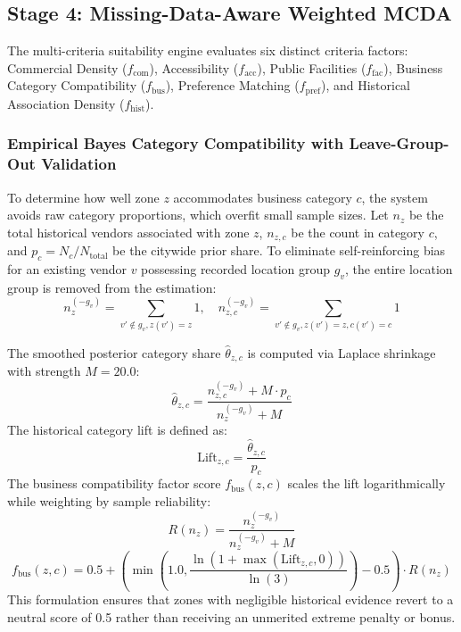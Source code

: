 \subsection{Stage 4: Missing-Data-Aware Weighted MCDA}
\label{sec:meth_stage4}

The multi-criteria suitability engine evaluates six distinct criteria factors: Commercial Density ($f_{\text{com}}$), Accessibility ($f_{\text{acc}}$), Public Facilities ($f_{\text{fac}}$), Business Category Compatibility ($f_{\text{bus}}$), Preference Matching ($f_{\text{pref}}$), and Historical Association Density ($f_{\text{hist}}$).

\subsubsection{Empirical Bayes Category Compatibility with Leave-Group-Out Validation}
To determine how well zone $z$ accommodates business category $c$, the system avoids raw category proportions, which overfit small sample sizes. Let $n_z$ be the total historical vendors associated with zone $z$, $n_{z,c}$ be the count in category $c$, and $p_c = N_c / N_{\text{total}}$ be the citywide prior share. To eliminate self-reinforcing bias for an existing vendor $v$ possessing recorded location group $g_v$, the entire location group is removed from the estimation:
\begin{equation}
    n_{z}^{(-g_v)} = \sum_{v' \notin g_v, z(v') = z} 1, \quad n_{z,c}^{(-g_v)} = \sum_{v' \notin g_v, z(v') = z, c(v') = c} 1
    \label{eq:leave_group_out}
\end{equation}

The smoothed posterior category share $\hat{\theta}_{z,c}$ is computed via Laplace shrinkage with strength $M = 20.0$:
\begin{equation}
    \hat{\theta}_{z,c} = \frac{n_{z,c}^{(-g_v)} + M \cdot p_c}{n_z^{(-g_v)} + M}
    \label{eq:shrinkage}
\end{equation}
The historical category lift is defined as:
\begin{equation}
    \text{Lift}_{z,c} = \frac{\hat{\theta}_{z,c}}{p_c}
    \label{eq:lift}
\end{equation}
The business compatibility factor score $f_{\text{bus}}(z, c)$ scales the lift logarithmically while weighting by sample reliability:
\begin{equation}
    R(n_z) = \frac{n_z^{(-g_v)}}{n_z^{(-g_v)} + M}
    \label{eq:reliability}
\end{equation}
\begin{equation}
    f_{\text{bus}}(z, c) = 0.5 + \left( \min\left(1.0, \frac{\ln(1 + \max(\text{Lift}_{z,c}, 0))}{\ln(3)}\right) - 0.5 \right) \cdot R(n_z)
    \label{eq:f_bus}
\end{equation}
This formulation ensures that zones with negligible historical evidence revert to a neutral score of 0.5 rather than receiving an unmerited extreme penalty or bonus.

